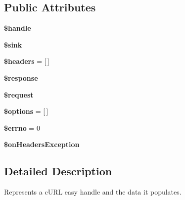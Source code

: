 \subsection*{Public Attributes}
\begin{DoxyCompactItemize}
\item 
\mbox{\label{classGuzzleHttp_1_1Handler_1_1EasyHandle_a5382e88143e18bd76824f6cd45f51516}} 
{\bfseries \$handle}
\item 
\mbox{\label{classGuzzleHttp_1_1Handler_1_1EasyHandle_a1de66a06a5edfd5c594369bbc94c4ff8}} 
{\bfseries \$sink}
\item 
\mbox{\label{classGuzzleHttp_1_1Handler_1_1EasyHandle_a954fb28b18ecd891c79f58c1b6655c88}} 
{\bfseries \$headers} = \mbox{[}$\,$\mbox{]}
\item 
\mbox{\label{classGuzzleHttp_1_1Handler_1_1EasyHandle_a8877bbc7a05f225c3d99fe1befad4751}} 
{\bfseries \$response}
\item 
\mbox{\label{classGuzzleHttp_1_1Handler_1_1EasyHandle_a41d6b6bca6e3f7c62651378ada47c6cf}} 
{\bfseries \$request}
\item 
\mbox{\label{classGuzzleHttp_1_1Handler_1_1EasyHandle_a4ebf31665c1d181e36a5fdefe7800e5d}} 
{\bfseries \$options} = \mbox{[}$\,$\mbox{]}
\item 
\mbox{\label{classGuzzleHttp_1_1Handler_1_1EasyHandle_ab2a3dd106a35514023671282b9fc30dd}} 
{\bfseries \$errno} = 0
\item 
\mbox{\label{classGuzzleHttp_1_1Handler_1_1EasyHandle_a1401ff8cd0922fb79618ec380589e64e}} 
{\bfseries \$on\+Headers\+Exception}
\end{DoxyCompactItemize}


\subsection{Detailed Description}
Represents a c\+U\+RL easy handle and the data it populates. 

